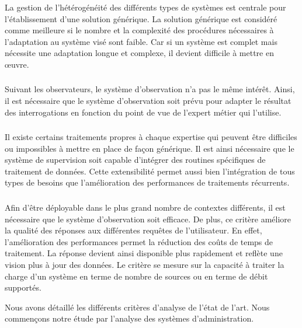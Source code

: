 \subsubsection{\critereCA}\label{sec:rw:supervision:criteres:adaptation}
La gestion de l'hétérogénéité des différents types de systèmes est centrale pour l'établissement d'une solution générique. La solution générique est considéré comme meilleure si le nombre et la complexité des procédures nécessaires à l'adaptation au système visé sont faible. Car si un système est complet mais nécessite une adaptation longue et complexe, il devient difficile à mettre en œuvre.

\subsubsection{\critereCB}
Suivant les observateurs, le système d'observation n'a pas le même intérêt. Ainsi, il est nécessaire que le système d'observation soit prévu pour adapter le résultat des interrogations en fonction du point de vue de l'expert métier qui l'utilise.

\subsubsection{\critereCC}
Il existe certains traitements propres à chaque expertise qui peuvent être difficiles ou impossibles à mettre en place de façon générique. Il est ainsi nécessaire que le système de supervision soit capable d'intégrer des routines spécifiques de traitement de données. Cette extensibilité permet aussi bien l'intégration de tous types de besoins que l'amélioration des performances de traitements récurrents.

\subsubsection{\critereCD}
Afin d'être déployable dans le plus grand nombre de contextes différents, il est nécessaire que le système d'observation soit efficace. De plus, ce critère améliore la qualité des réponses aux différentes requêtes de l'utilisateur. En effet, l'amélioration des performances permet la réduction des coûts de temps de traitement. La réponse devient ainsi disponible plus rapidement et reflète une vision plus à jour des données. Le critère se mesure sur la capacité à traiter la charge d'un système en terme de nombre de sources ou en terme de débit supportés.

Nous avons détaillé les différents critères d'analyse de l'état de l'art. Nous commençons notre étude par l'analyse des systèmes d'administration.
